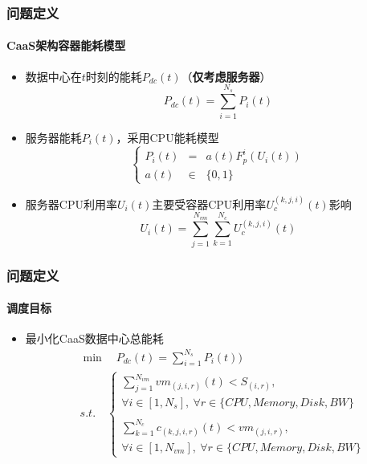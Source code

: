 \begin{frame}
\frametitle{问题定义}
\framesubtitle{CaaS架构容器能耗模型}
\begin{itemize}
    \item 数据中心在$t$时刻的能耗$P_{dc}(t)$（\textbf{仅考虑服务器}）
    \begin{equation}
        P_{dc}(t) = \sum_{i=1}^{N_s} P_i(t)
    \end{equation}
    \item 服务器能耗$P_i(t)$，采用CPU能耗模型
    \begin{equation}
    \left\{
        \begin{array}{rcl}
            P_i(t) &=& a(t)F_p^i(U_i(t)) \\
            a(t) &\in& \{0,1\}
        \end{array}
    \right.
    \end{equation}
    \item 服务器CPU利用率$U_i(t)$主要受容器CPU利用率$U_c^{(k,j,i)}(t)$影响
    \begin{equation}
        U_i(t) = \sum_{j=1}^{N_{vm}}\sum_{k=1}^{N_c} U_c^{(k,j,i)}(t)
    \end{equation}
\end{itemize}
\end{frame}


\begin{frame}
\frametitle{问题定义}
\framesubtitle{调度目标}
\begin{itemize}
    \item 最小化CaaS数据中心总能耗
    \begin{equation}
    \begin{align*}
            &\min\quad P_{dc}(t)=\sum_{i=1}^{N_s} P_i(t)) \\
            &s.t.\quad
            \begin{cases}
            \sum_{j=1}^{N_{vm}}vm_{(j,i,r)}(t) < S_(i,r),\\
            \forall i \in [1,N_s],\ \forall r \in \{CPU,Memory,Disk,BW\} \\
            \\
            \sum_{k=1}^{N_{c}}c_{(k,j,i,r)}(t) < vm_(j,i,r),\\
            \forall i \in [1,N_{vm}],\ \forall r \in \{CPU,Memory,Disk,BW\}
            \end{cases}
    \end{align*}
    \end{equation}
\end{itemize}
\end{frame}

